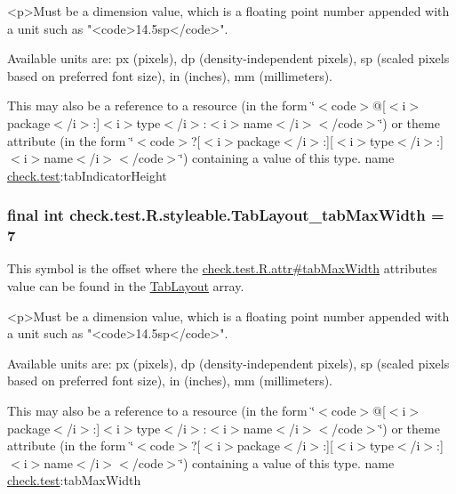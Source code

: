 \begin{DoxyVerb}      <p>Must be a dimension value, which is a floating point number appended with a unit such as "<code>14.5sp</code>".
\end{DoxyVerb}
 Available units are\+: px (pixels), dp (density-\/independent pixels), sp (scaled pixels based on preferred font size), in (inches), mm (millimeters). 

This may also be a reference to a resource (in the form \char`\"{}$<$code$>$@\mbox{[}$<$i$>$package$<$/i$>$\+:\mbox{]}$<$i$>$type$<$/i$>$\+:$<$i$>$name$<$/i$>$$<$/code$>$\char`\"{}) or theme attribute (in the form \char`\"{}$<$code$>$?\mbox{[}$<$i$>$package$<$/i$>$\+:\mbox{]}\mbox{[}$<$i$>$type$<$/i$>$\+:\mbox{]}$<$i$>$name$<$/i$>$$<$/code$>$\char`\"{}) containing a value of this type.  name \hyperlink{namespacecheck_1_1test}{check.\+test}\+:tab\+Indicator\+Height \hypertarget{classcheck_1_1test_1_1_r_1_1styleable_a53f614a296e5bfb7bb73efa8b8b97a85}{}
\subsubsection[{Tab\+Layout\+\_\+tab\+Max\+Width}]{\setlength{\rightskip}{0pt plus 5cm}final int check.\+test.\+R.\+styleable.\+Tab\+Layout\+\_\+tab\+Max\+Width = 7\hspace{0.3cm}{\ttfamily [static]}}\label{classcheck_1_1test_1_1_r_1_1styleable_a53f614a296e5bfb7bb73efa8b8b97a85}
This symbol is the offset where the \hyperlink{classcheck_1_1test_1_1_r_1_1attr_a4891fae4f27ae76a2dd289815ab27d96}{check.\+test.\+R.\+attr\#tab\+Max\+Width} attribute\textquotesingle{}s value can be found in the \hyperlink{classcheck_1_1test_1_1_r_1_1styleable_a2a3232e8d38a43f5131a16385abbbed8}{Tab\+Layout} array.

\begin{DoxyVerb}      <p>Must be a dimension value, which is a floating point number appended with a unit such as "<code>14.5sp</code>".
\end{DoxyVerb}
 Available units are\+: px (pixels), dp (density-\/independent pixels), sp (scaled pixels based on preferred font size), in (inches), mm (millimeters). 

This may also be a reference to a resource (in the form \char`\"{}$<$code$>$@\mbox{[}$<$i$>$package$<$/i$>$\+:\mbox{]}$<$i$>$type$<$/i$>$\+:$<$i$>$name$<$/i$>$$<$/code$>$\char`\"{}) or theme attribute (in the form \char`\"{}$<$code$>$?\mbox{[}$<$i$>$package$<$/i$>$\+:\mbox{]}\mbox{[}$<$i$>$type$<$/i$>$\+:\mbox{]}$<$i$>$name$<$/i$>$$<$/code$>$\char`\"{}) containing a value of this type.  name \hyperlink{namespacecheck_1_1test}{check.\+test}\+:tab\+Max\+Width \hypertarget{classcheck_1_1test_1_1_r_1_1styleable_aa3b9b9d3b5f02ead0c41b9100556ca2a}{}
